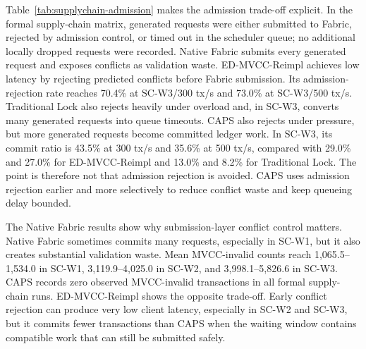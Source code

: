 \documentclass[fleqn,10pt,lineno]{wlpeerj}
\begin{document}
Table~\ref{tab:supplychain-admission} makes the admission trade-off explicit. In the formal supply-chain matrix, generated requests were either submitted to Fabric, rejected by admission control, or timed out in the scheduler queue; no additional locally dropped requests were recorded. Native Fabric submits every generated request and exposes conflicts as validation waste. ED-MVCC-Reimpl achieves low latency by rejecting predicted conflicts before Fabric submission. Its admission-rejection rate reaches 70.4\% at SC-W3/300 tx/s and 73.0\% at SC-W3/500 tx/s. Traditional Lock also rejects heavily under overload and, in SC-W3, converts many generated requests into queue timeouts. CAPS also rejects under pressure, but more generated requests become committed ledger work. In SC-W3, its commit ratio is 43.5\% at 300 tx/s and 35.6\% at 500 tx/s, compared with 29.0\% and 27.0\% for ED-MVCC-Reimpl and 13.0\% and 8.2\% for Traditional Lock. The point is therefore not that admission rejection is avoided. CAPS uses admission rejection earlier and more selectively to reduce conflict waste and keep queueing delay bounded.

The Native Fabric results show why submission-layer conflict control matters. Native Fabric sometimes commits many requests, especially in SC-W1, but it also creates substantial validation waste. Mean MVCC-invalid counts reach 1,065.5--1,534.0 in SC-W1, 3,119.9--4,025.0 in SC-W2, and 3,998.1--5,826.6 in SC-W3. CAPS records zero observed MVCC-invalid transactions in all formal supply-chain runs. ED-MVCC-Reimpl shows the opposite trade-off. Early conflict rejection can produce very low client latency, especially in SC-W2 and SC-W3, but it commits fewer transactions than CAPS when the waiting window contains compatible work that can still be submitted safely.
\end{document}
